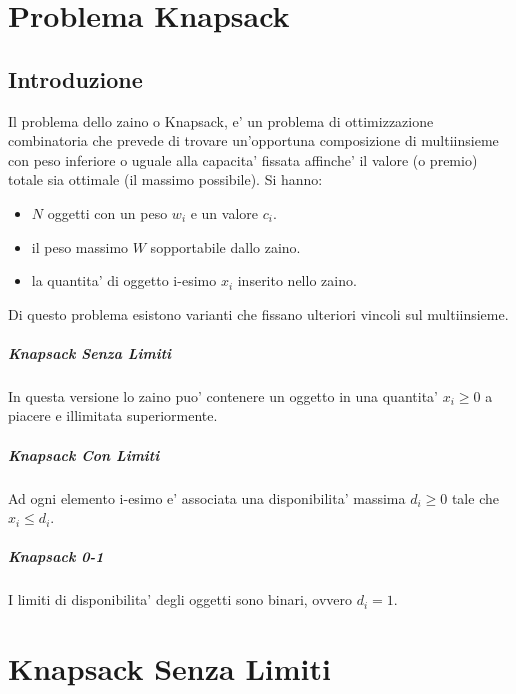 \chapter{Problema Knapsack}
\section{Introduzione}

Il problema dello zaino o Knapsack, e' un problema di ottimizzazione combinatoria che prevede di trovare un'opportuna composizione di multiinsieme con peso inferiore o uguale alla capacita' fissata affinche' il valore (o premio) totale sia ottimale (il massimo possibile).
Si hanno: \\

\begin{itemize}
    \item $N$ oggetti con un peso $w_{i}$ e un valore $c_{i}$.
    \item il peso massimo $W$ sopportabile dallo zaino.
    \item la quantita' di oggetto i-esimo $x_i$ inserito nello zaino.
\end{itemize}

Di questo problema esistono varianti che fissano ulteriori vincoli sul multiinsieme.

\paragraph{Knapsack Senza Limiti}

In questa versione lo zaino puo' contenere un oggetto in una quantita' $x_i \geq 0$ a piacere e illimitata superiormente.

\paragraph{Knapsack Con Limiti}

Ad ogni elemento i-esimo e' associata una disponibilita' massima $d_i \geq 0$ tale che $x_i \leq d_i$.

\paragraph{Knapsack 0-1}

I limiti di disponibilita' degli oggetti sono binari, ovvero $d_i = 1$.

\chapter{Knapsack Senza Limiti}

